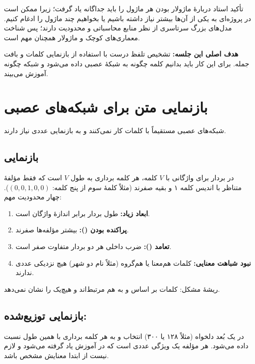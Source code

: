 \begin{exambox}{تأکید استاد دربارهٔ ماژولار بودن}
هر ماژول را باید جداگانه یاد گرفت؛ زیرا ممکن است در پروژه‌ای به یکی از آن‌ها بیشتر نیاز داشته باشیم یا بخواهیم چند ماژول را ادغام کنیم. مدل‌های بزرگ سرتاسری از نظر منابع محاسباتی و  محدودیت دارند؛ پس شناخت معماری‌های کوچک و ماژولار همچنان مهم است.
\end{exambox}

\textbf{هدف اصلی این جلسه:} تشخیص تلفظ درست  با استفاده از بازنمایی کلمات و بافت جمله. برای این کار باید بدانیم کلمه چگونه به شبکهٔ عصبی داده می‌شود و شبکه چگونه آموزش می‌بیند.

\section{بازنمایی متن برای شبکه‌های عصبی}

شبکه‌های عصبی مستقیماً با کلمات کار نمی‌کنند و به بازنمایی عددی نیاز دارند.

\subsection{بازنمایی }
در بردار  برای واژگانی با $V$ کلمه، هر کلمه برداری به طول $V$ است که فقط مؤلفهٔ متناظر با اندیس کلمه ۱ و بقیه صفرند (مثلاً کلمهٔ سوم از پنج کلمه: $(0,0,1,0,0)$). چهار محدودیت مهم:
\begin{enumerate}
  \item \textbf{ابعاد زیاد:} طول بردار برابر اندازهٔ واژگان است.
  \item \textbf{پراکنده بودن ():} بیشتر مؤلفه‌ها صفرند.
  \item \textbf{تعامد ():} ضرب داخلی هر دو بردار متفاوت صفر است.
  \item \textbf{نبود شباهت معنایی:} کلمات هم‌معنا یا هم‌گروه (مثلاً نام دو شهر) هیچ نزدیکی عددی ندارند.
\end{enumerate}
ریشهٔ مشکل: کلمات بر اساس  و  به هم مرتبط‌اند و  هیچ‌یک را نشان نمی‌دهد.

\subsection{بازنمایی توزیع‌شده: }
در  یک بُعد دلخواه (مثلاً ۱۲۸ یا ۳۰۰) انتخاب و به هر کلمه برداری با همین طول نسبت داده می‌شود. هر مؤلفه یک ویژگی عددی است که در آموزش یاد گرفته می‌شود و لازم نیست از ابتدا معنایش مشخص باشد.

